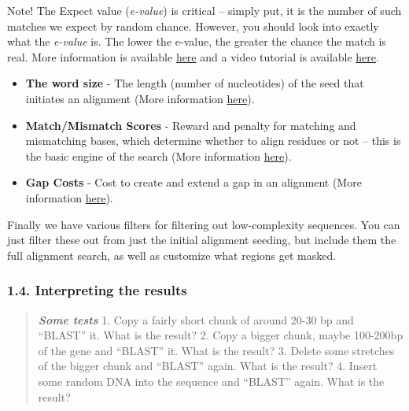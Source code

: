 \documentclass[]{article}
\begin{document}
Note! The Expect value (\emph{e-value}) is critical -- simply put, it is
the number of such matches we expect by random chance. However, you
should look into exactly what the \emph{e-value} is. The lower the
e-value, the greater the chance the match is real. More information is
available
\href{http://www.ncbi.nlm.nih.gov/BLAST/blastcgihelp.shtml\#expect}{here}
and a video tutorial is available
\href{https://www.youtube.com/watch?v=nO0wJgZRZJs}{here}.

\begin{itemize}
\itemsep1pt\parskip0pt
\item
  \textbf{The word size} - The length (number of nucleotides) of the
  seed that initiates an alignment (More information
  \href{http://www.ncbi.nlm.nih.gov/BLAST/blastcgihelp.shtml\#wordsize}{here}).
\item
  \textbf{Match/Mismatch Scores} - Reward and penalty for matching and
  mismatching bases, which determine whether to align residues or not --
  this is the basic engine of the search (More information
  \href{http://www.ncbi.nlm.nih.gov/BLAST/blastcgihelp.shtml\#Reward-penalty}{here}).
\item
  \textbf{Gap Costs} - Cost to create and extend a gap in an alignment
  (More information
  \href{http://www.ncbi.nlm.nih.gov/BLAST/blastcgihelp.shtml\#Reward-penalty}{here}).
\end{itemize}

Finally we have various filters for filtering out low-complexity
sequences. You can just filter these out from just the initial alignment
seeding, but include them the full alignment search, as well as
customize what regions get masked.

\subsubsection{1.4. Interpreting the
results}\label{interpreting-the-results}

\begin{quote}
\emph{\textbf{Some tests}} 1. Copy a fairly short chunk of around 20-30
bp and ``BLAST'' it. What is the result? 2. Copy a bigger chunk, maybe
100-200bp of the gene and ``BLAST'' it. What is the result? 3. Delete
some stretches of the bigger chunk and ``BLAST'' again. What is the
result? 4. Insert some random DNA into the sequence and ``BLAST'' again.
What is the result?
\end{quote}
\end{document}
